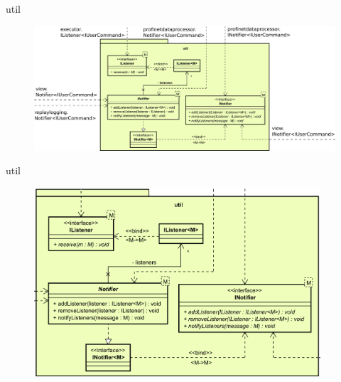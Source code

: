 \begin{frame}{util}
  \begin{figure}
    \centering
    \includegraphics[width=\textwidth]{./images/util.png}
  \end{figure}
\end{frame}

\begin{frame}{util}
  \begin{figure}
    \centering
    \includegraphics[width=0.95\textwidth]{./images/util-cropped.png}
  \end{figure}
\end{frame}
